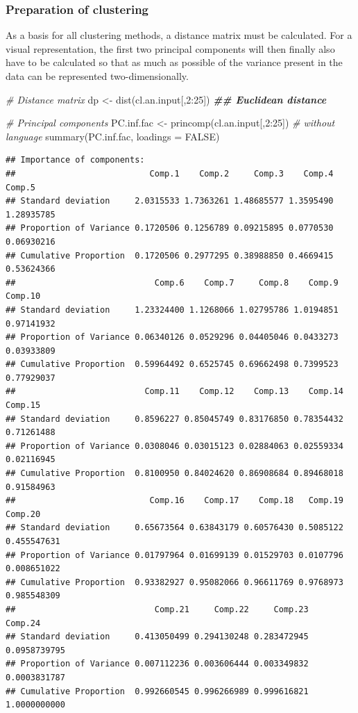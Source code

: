 \documentclass[
]{article}
\newenvironment{Shaded}{\begin{snugshade}}{\end{snugshade}}
\newcommand{\AttributeTok}[1]{\textcolor[rgb]{0.77,0.63,0.00}{#1}}
\newcommand{\CommentTok}[1]{\textcolor[rgb]{0.56,0.35,0.01}{\textit{#1}}}
\newcommand{\ConstantTok}[1]{\textcolor[rgb]{0.00,0.00,0.00}{#1}}
\newcommand{\DecValTok}[1]{\textcolor[rgb]{0.00,0.00,0.81}{#1}}
\newcommand{\DocumentationTok}[1]{\textcolor[rgb]{0.56,0.35,0.01}{\textbf{\textit{#1}}}}
\newcommand{\FunctionTok}[1]{\textcolor[rgb]{0.00,0.00,0.00}{#1}}
\newcommand{\NormalTok}[1]{#1}
\newcommand{\OtherTok}[1]{\textcolor[rgb]{0.56,0.35,0.01}{#1}}
\newcommand{\SpecialCharTok}[1]{\textcolor[rgb]{0.00,0.00,0.00}{#1}}
\begin{document}
\hypertarget{preparation-of-clustering}{%
\subsubsection{Preparation of
clustering}\label{preparation-of-clustering}}

As a basis for all clustering methods, a distance matrix must be
calculated. For a visual representation, the first two principal
components will then finally also have to be calculated so that as much
as possible of the variance present in the data can be represented
two-dimensionally.

\begin{Shaded}
\begin{Highlighting}[]
\CommentTok{\# Distance matrix}
\NormalTok{dp }\OtherTok{\textless{}{-}} \FunctionTok{dist}\NormalTok{(cl.an.input[,}\DecValTok{2}\SpecialCharTok{:}\DecValTok{25}\NormalTok{]) }\DocumentationTok{\#\# Euclidean distance}

\CommentTok{\# Principal components}
\NormalTok{PC.inf.fac }\OtherTok{\textless{}{-}} \FunctionTok{princomp}\NormalTok{(cl.an.input[,}\DecValTok{2}\SpecialCharTok{:}\DecValTok{25}\NormalTok{]) }\CommentTok{\# without language}
\FunctionTok{summary}\NormalTok{(PC.inf.fac, }\AttributeTok{loadings =} \ConstantTok{FALSE}\NormalTok{) }
\end{Highlighting}
\end{Shaded}

\begin{verbatim}
## Importance of components:
##                           Comp.1    Comp.2     Comp.3    Comp.4     Comp.5
## Standard deviation     2.0315533 1.7363261 1.48685577 1.3595490 1.28935785
## Proportion of Variance 0.1720506 0.1256789 0.09215895 0.0770530 0.06930216
## Cumulative Proportion  0.1720506 0.2977295 0.38988850 0.4669415 0.53624366
##                            Comp.6    Comp.7     Comp.8    Comp.9    Comp.10
## Standard deviation     1.23324400 1.1268066 1.02795786 1.0194851 0.97141932
## Proportion of Variance 0.06340126 0.0529296 0.04405046 0.0433273 0.03933809
## Cumulative Proportion  0.59964492 0.6525745 0.69662498 0.7399523 0.77929037
##                          Comp.11    Comp.12    Comp.13    Comp.14    Comp.15
## Standard deviation     0.8596227 0.85045749 0.83176850 0.78354432 0.71261488
## Proportion of Variance 0.0308046 0.03015123 0.02884063 0.02559334 0.02116945
## Cumulative Proportion  0.8100950 0.84024620 0.86908684 0.89468018 0.91584963
##                           Comp.16    Comp.17    Comp.18   Comp.19     Comp.20
## Standard deviation     0.65673564 0.63843179 0.60576430 0.5085122 0.455547631
## Proportion of Variance 0.01797964 0.01699139 0.01529703 0.0107796 0.008651022
## Cumulative Proportion  0.93382927 0.95082066 0.96611769 0.9768973 0.985548309
##                            Comp.21     Comp.22     Comp.23      Comp.24
## Standard deviation     0.413050499 0.294130248 0.283472945 0.0958739795
## Proportion of Variance 0.007112236 0.003606444 0.003349832 0.0003831787
## Cumulative Proportion  0.992660545 0.996266989 0.999616821 1.0000000000
\end{verbatim}
\end{document}
